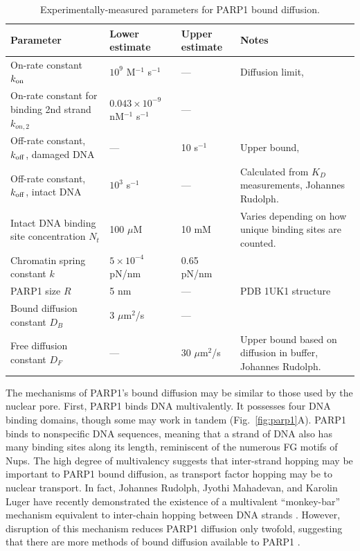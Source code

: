 \begin{table}[b]
  \caption[Experimentally-measured parameters for PARP1 bound diffusion.]{Experimentally-measured parameters for PARP1 bound diffusion.}
    \label{table:parp1}
    \begin{tabular}{p{5cm}p{3cm}p{2.7cm}p{5.4cm}}
      Parameter & Lower estimate & Upper estimate  & Notes\\
      \hline
	On-rate constant $k_{\rm on}$ & $10^9$ M$^{-1}$ s$^{-1}$  & ---  &Diffusion limit, \cite{rudolph18}\\ \hline
On-rate constant for binding 2nd strand $k_{on,2}$ & $0.043 \times 10^{-9}$ nM$^{-1}$ s$^{-1}$  & ---  & \cite{rudolph18}\\ \hline
	Off-rate constant, $k_{\rm off}$, damaged DNA & --- & 10 s$^{-1}$  & Upper bound, \cite{rudolph18} \\ \hline
	Off-rate constant, $k_{\rm off}$, intact DNA & $10^3$ s$^{-1}$ & ---  & Calculated from  $K_D$ measurements, Johannes Rudolph.\\ \hline
	Intact DNA binding site concentration $N_t$ & 100 $\mu$M & 10 mM & Varies depending on how unique binding sites are counted.\\ \hline
	Chromatin spring constant $k$ & $5\times10^{-4}$ pN/nm & 0.65 pN/nm  & \cite{nozaki17, norouzi18}\\ \hline
	PARP1 size $R$ & 5 nm & ---  & PDB 1UK1 structure\\ \hline
	Bound diffusion constant $D_B$ & 3 $\mu$m$^2$/s & ---  & \cite{mahadevan18}\\ \hline
	Free diffusion constant $D_F$ & --- & 30 $\mu$m$^2$/s  & Upper bound based on diffusion in buffer, Johannes Rudolph.\\
 \hline
    \end{tabular}
\end{table}

The mechanisms of PARP1's bound diffusion may be similar to those used by the nuclear pore.  First, PARP1 binds DNA multivalently.  It possesses four DNA binding domains, though some may work in tandem (Fig.~\ref{fig:parp1}A).  PARP1 binds to nonspecific DNA sequences, meaning that a strand of DNA also has many binding sites along its length, reminiscent of the numerous FG motifs of Nups.  The high degree of multivalency suggests that inter-strand hopping may be important to PARP1 bound diffusion, as transport factor hopping may be to nuclear transport.  In fact, Johannes Rudolph, Jyothi Mahadevan, and Karolin Luger have recently demonstrated the existence of a multivalent ``monkey-bar'' mechanism equivalent to inter-chain hopping between DNA strands \cite{rudolph18}.  However, disruption of this mechanism reduces PARP1 diffusion only twofold, suggesting that there are more methods of bound diffusion available to PARP1 \cite{mahadevan18}.

